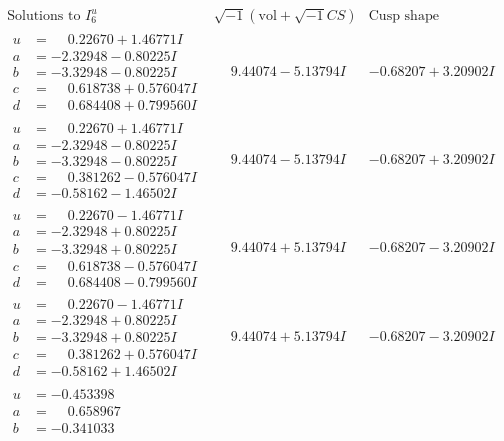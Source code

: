 \documentclass[1p]{elsarticle_modified}
\theoremstyle{definition}
\newcommand{\I}{\sqrt{-1}}
\begin{document}
$$\begin{array}{c|c|c}  
\text{Solutions to }I^u_{6}& \I (\text{vol} + \sqrt{-1}CS) & \text{Cusp shape}\\
 \hline 
\begin{aligned}
u &= \phantom{-}0.22670 + 1.46771 I \\
a &= -2.32948 - 0.80225 I \\
b &= -3.32948 - 0.80225 I \\
c &= \phantom{-}0.618738 + 0.576047 I \\
d &= \phantom{-}0.684408 + 0.799560 I\end{aligned}
 & \phantom{-}9.44074 - 5.13794 I & -0.68207 + 3.20902 I \\ \hline\begin{aligned}
u &= \phantom{-}0.22670 + 1.46771 I \\
a &= -2.32948 - 0.80225 I \\
b &= -3.32948 - 0.80225 I \\
c &= \phantom{-}0.381262 - 0.576047 I \\
d &= -0.58162 - 1.46502 I\end{aligned}
 & \phantom{-}9.44074 - 5.13794 I & -0.68207 + 3.20902 I \\ \hline\begin{aligned}
u &= \phantom{-}0.22670 - 1.46771 I \\
a &= -2.32948 + 0.80225 I \\
b &= -3.32948 + 0.80225 I \\
c &= \phantom{-}0.618738 - 0.576047 I \\
d &= \phantom{-}0.684408 - 0.799560 I\end{aligned}
 & \phantom{-}9.44074 + 5.13794 I & -0.68207 - 3.20902 I \\ \hline\begin{aligned}
u &= \phantom{-}0.22670 - 1.46771 I \\
a &= -2.32948 + 0.80225 I \\
b &= -3.32948 + 0.80225 I \\
c &= \phantom{-}0.381262 + 0.576047 I \\
d &= -0.58162 + 1.46502 I\end{aligned}
 & \phantom{-}9.44074 + 5.13794 I & -0.68207 - 3.20902 I \\ \hline\begin{aligned}
u &= -0.453398\phantom{ +0.000000I} \\
a &= \phantom{-}0.658967\phantom{ +0.000000I} \\
b &= -0.341033\phantom{ +0.000000I} \\

\end{aligned}
\end{array}$$
\end{document}
